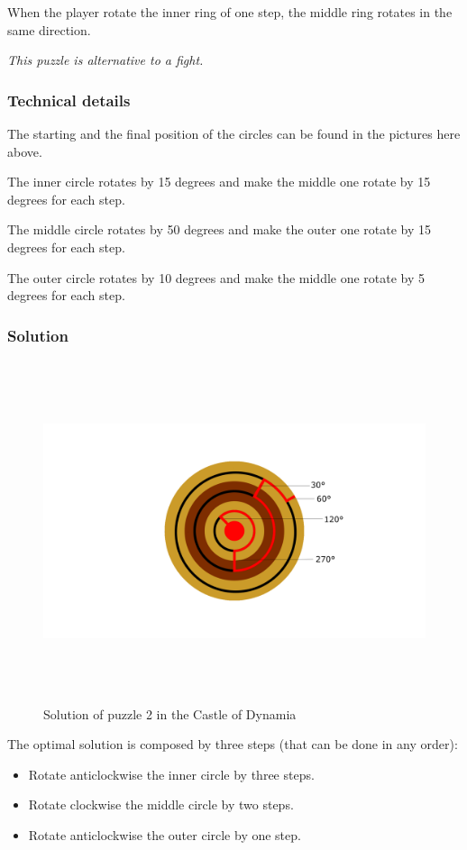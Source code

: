 When the player rotate the inner ring of one step, the middle ring rotates in the same direction.

\textit{This puzzle is alternative to a fight.}

\subsubsection*{Technical details}
The starting and the final position of the circles can be found in the pictures here above.

The inner circle rotates by 15 degrees and make the middle one rotate by 15 degrees for each step.

The middle circle rotates by 50 degrees and make the outer one rotate by 15 degrees for each step.

The outer circle rotates by 10 degrees and make the middle one rotate by 5 degrees for each step.

\subsubsection*{Solution}
\begin{figure}[H]
  \centering
  \includegraphics[height=10cm]{Images/Puzzles/castleOfDynamia2Solution}
  \caption{Solution of puzzle 2 in the Castle of Dynamia}
\end{figure}

The optimal solution is composed by three steps (that can be done in any order):
\begin{itemize}
	\item Rotate anticlockwise the inner circle by three steps.
	\item Rotate clockwise the middle circle by two steps.
	\item Rotate anticlockwise the outer circle by one step.
\end{itemize}

